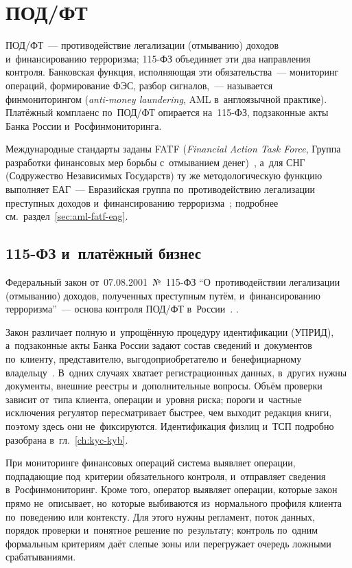
\chapter{ПОД/ФТ}\label{ch:aml}
ПОД/ФТ~--- противодействие легализации (отмыванию) доходов
и~финансированию терроризма; 115-ФЗ объединяет эти два направления контроля.
Банковская функция, исполняющая эти обязательства~--- мониторинг операций,
формирование ФЭС, разбор сигналов,~--- называется финмониторингом
(\textit{anti-money laundering}, AML в~англоязычной практике). Платёжный
комплаенс по~ПОД/ФТ опирается на~115-ФЗ, подзаконные акты Банка России
и~Росфинмониторинга.

Международные стандарты заданы FATF (\textit{Financial Action Task Force},
Группа разработки финансовых мер борьбы с~отмыванием денег)~\cite{fatf-recs},
а~для СНГ (Содружество Независимых Государств) ту же методологическую функцию
выполняет ЕАГ~--- Евразийская группа по~противодействию легализации преступных
доходов и~финансированию терроризма~\cite{eag-overview}; подробнее
см.~раздел~\ref{sec:aml-fatf-eag}.

\section{115-ФЗ и~платёжный бизнес}\label{sec:aml-115fz}

Федеральный закон от~07.08.2001~№~115-ФЗ \enquote{О~противодействии легализации
  (отмыванию) доходов, полученных преступным путём, и~финансированию
терроризма}~--- основа контроля ПОД/ФТ в~России~\cite{fz-115}. .

Закон различает полную и~упрощённую процедуру идентификации (УПРИД),
а~подзаконные акты Банка России задают состав сведений и~документов
по~клиенту, представителю, выгодоприобретателю и~бенефициарному
владельцу~\cite{cbr-499p}. В~одних случаях хватает регистрационных данных,
в~других нужны документы, внешние реестры и~дополнительные вопросы. Объём проверки зависит от~типа клиента, операции
и~уровня риска; пороги и~частные исключения регулятор пересматривает быстрее,
чем выходит редакция книги, поэтому здесь они не~фиксируются. Идентификация
физлиц и~ТСП подробно разобрана в~гл.~\ref{ch:kyc-kyb}.

При мониторинге финансовых операций система выявляет операции, подпадающие
под~критерии обязательного контроля, и~отправляет сведения в~Росфинмониторинг.
Кроме того, оператор выявляет операции, которые закон прямо не~описывает,
но~которые выбиваются из~нормального профиля клиента по~поведению или контексту. Для этого нужны регламент, поток данных, порядок
проверки и~понятное решение по~результату; контроль по~одним формальным
критериям даёт слепые зоны или перегружает очередь ложными срабатываниями.

